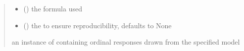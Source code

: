 \documentclass[letterpaper,10pt,english]{sphinxmanual}
\begin{document}
\begin{fulllineitems}
\begin{quote}
\begin{description}
\begin{itemize}
\item {} 
\sphinxAtStartPar
{} () \textendash{} the formula used

\item {} 
\sphinxAtStartPar
{} (\sphinxstyleliteralemphasis{\sphinxupquote{, }}) \textendash{} the  to ensure reproducibility, defaults to None

\end{itemize}

\sphinxAtStartPar
an instance of  containing ordinal responses drawn from the specified model

\end{description}\end{quote}

\end{fulllineitems}

\end{document}
